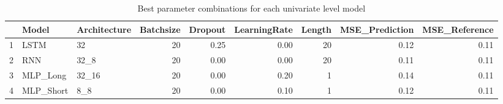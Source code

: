 \begin{table}[ht]
\centering
\begin{tabular}{rllrrrrrr}
  \hline
 & Model & Architecture & Batchsize & Dropout & LearningRate & Length & MSE\_Prediction & MSE\_Reference \\ 
  \hline
1 & LSTM & 32 &  20 & 0.25 & 0.00 &  20 & 0.12 & 0.11 \\ 
  2 & RNN & 32\_8 &  20 & 0.00 & 0.00 &  20 & 0.11 & 0.11 \\ 
  3 & MLP\_Long & 32\_16 &  20 & 0.00 & 0.20 &   1 & 0.14 & 0.11 \\ 
  4 & MLP\_Short & 8\_8 &  20 & 0.00 & 0.10 &   1 & 0.12 & 0.11 \\ 
   \hline
\end{tabular}
\caption{Best parameter combinations for each univariate level model} 
\label{tab:best_models}
\end{table}
